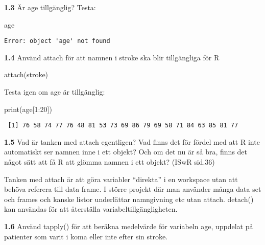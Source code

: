 \documentclass[
  letterpaper,
  DIV=11,
  numbers=noendperiod]{scrartcl}
\newenvironment{Shaded}{\begin{snugshade}}{\end{snugshade}}
\newcommand{\AttributeTok}[1]{\textcolor[rgb]{0.40,0.45,0.13}{#1}}
\newcommand{\ConstantTok}[1]{\textcolor[rgb]{0.56,0.35,0.01}{#1}}
\newcommand{\DecValTok}[1]{\textcolor[rgb]{0.68,0.00,0.00}{#1}}
\newcommand{\FunctionTok}[1]{\textcolor[rgb]{0.28,0.35,0.67}{#1}}
\newcommand{\NormalTok}[1]{\textcolor[rgb]{0.00,0.23,0.31}{#1}}
\newcommand{\SpecialCharTok}[1]{\textcolor[rgb]{0.37,0.37,0.37}{#1}}
\begin{document}
\textbf{1.3} Är age tillgänglig? Testa:

\begin{Shaded}
\begin{Highlighting}[]
\NormalTok{age}
\end{Highlighting}
\end{Shaded}

\begin{verbatim}
Error: object 'age' not found
\end{verbatim}

\textbf{1.4} Använd attach för att namnen i stroke ska blir tillgängliga
för R

\begin{Shaded}
\begin{Highlighting}[]
\FunctionTok{attach}\NormalTok{(stroke)}
\end{Highlighting}
\end{Shaded}

Testa igen om age är tillgänglig:

\begin{Shaded}
\begin{Highlighting}[]
\FunctionTok{print}\NormalTok{(age[}\DecValTok{1}\SpecialCharTok{:}\DecValTok{20}\NormalTok{])}
\end{Highlighting}
\end{Shaded}

\begin{verbatim}
 [1] 76 58 74 77 76 48 81 53 73 69 86 79 69 58 71 84 63 85 81 77
\end{verbatim}

\textbf{1.5} Vad är tanken med attach egentligen? Vad finns det för
fördel med att R inte automatiskt ser namnen inne i ett objekt? Och om
det nu är så bra, finns det något sätt att få R att glömma namnen i ett
objekt? (ISwR sid.36)

Tanken med attach är att göra variabler ``direkta'' i en workspace utan
att behöva referera till data frame. I större projekt där man använder
många data set och frames och kanske listor underlättar namngivning etc
utan attach. detach() kan användas för att återställa
variabeltillgängligheten.

\textbf{1.6} Använd tapply() för att beräkna medelvärde för variabeln
age, uppdelat på patienter som varit i koma eller inte efter sin stroke.

\begin{Shaded}
\end{Shaded}
\end{document}
